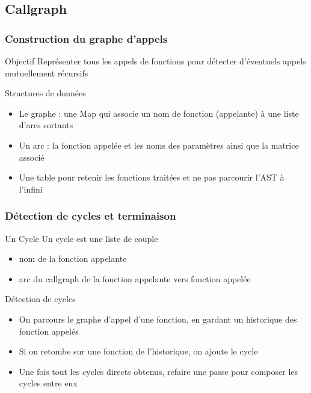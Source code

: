 \subsection{Callgraph}
\begin{frame}
  \frametitle{Construction du graphe d'appels}
  \begin{block}{Objectif}
    Représenter tous les appels de fonctions pour détecter d'éventuels appels mutuellement récursifs
  \end{block}
  \begin{block}{Structures de données}
    \begin{itemize}
    \item Le graphe : une Map qui associe un nom de fonction (appelante) à une liste d'arcs sortants
    \item Un arc : la fonction appelée et les noms des paramètres
      ainsi que la matrice associé
    \item Une table pour retenir les fonctions traitées et ne pas parcourir l'AST à l'infini
    \end{itemize}
  \end{block}
\end{frame}

\begin{frame}
  \frametitle{Détection de cycles et terminaison}
  \begin{block}{Un Cycle}
    Un cycle est une liste de couple
    \begin{itemize}
    \item nom de la fonction appelante 
    \item arc du callgraph de la fonction appelante vers fonction appelée
    \end{itemize}
  \end{block}
  \begin{block}{Détection de cycles}
    \begin{itemize}
    \item On parcours le graphe d'appel d'une fonction, en gardant un
      historique des fonction appelés
    \item Si on retombe sur une fonction de l'historique, on ajoute le
      cycle
    \item Une fois tout les cycles directs obtenus, refaire une passe
      pour composer les cycles entre eux
    \end{itemize}
  \end{block}
\end{frame}
  
